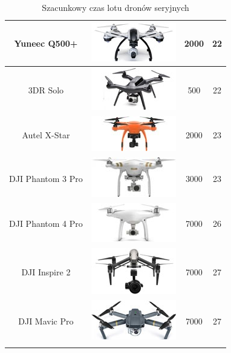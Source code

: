 \begin{longtable}{|c|c|c|c|}
    	    Yuneec Q500+ & \includegraphics{zalaczniki/obrazy/drony_miniaturki/yuneec.jpg} & 2000 & 22 \\ \hline
    	    3DR Solo & \includegraphics{zalaczniki/obrazy/drony_miniaturki/3dr-solo.jpg} & 500 & 22 \\ \hline
    	    Autel X-Star & \includegraphics{zalaczniki/obrazy/drony_miniaturki/autel.jpg} & 2000 & 23 \\ \hline
    	    DJI Phantom 3 Pro & \includegraphics{zalaczniki/obrazy/drony_miniaturki/dji-phantom-3-professional.jpg} & 3000 & 23 \\ \hline
    	    DJI Phantom 4 Pro & \includegraphics{zalaczniki/obrazy/drony_miniaturki/DJI-Phantom-4.jpg} & 7000 & 26 \\ \hline
    	    DJI Inspire 2 & \includegraphics{zalaczniki/obrazy/drony_miniaturki/dji_inspire.jpg} & 7000 & 27 \\ \hline
    	    DJI Mavic Pro & \includegraphics{zalaczniki/obrazy/drony_miniaturki/dji_mavic.jpg} & 7000 & 27 \\ \hline
    \caption{Szacunkowy czas lotu dronów seryjnych \cite{szacunkowyczaslotu}}
    \label{tab:czasLotuDronow}
\end{longtable}


